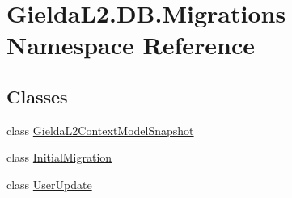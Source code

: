 \hypertarget{namespace_gielda_l2_1_1_d_b_1_1_migrations}{}\section{Gielda\+L2.\+D\+B.\+Migrations Namespace Reference}
\label{namespace_gielda_l2_1_1_d_b_1_1_migrations}
\subsection*{Classes}
\begin{DoxyCompactItemize}
\item 
class \mbox{\hyperlink{class_gielda_l2_1_1_d_b_1_1_migrations_1_1_gielda_l2_context_model_snapshot}{Gielda\+L2\+Context\+Model\+Snapshot}}
\item 
class \mbox{\hyperlink{class_gielda_l2_1_1_d_b_1_1_migrations_1_1_initial_migration}{Initial\+Migration}}
\item 
class \mbox{\hyperlink{class_gielda_l2_1_1_d_b_1_1_migrations_1_1_user_update}{User\+Update}}
\end{DoxyCompactItemize}
